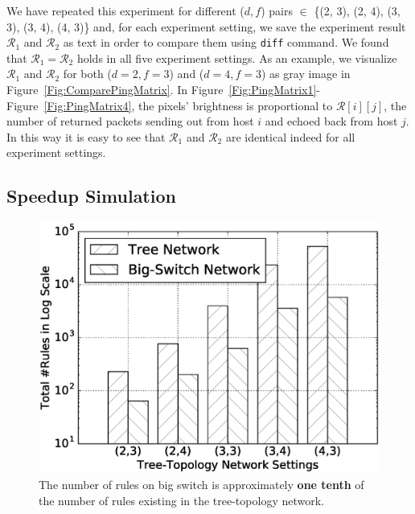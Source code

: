 We have repeated this experiment for different ($d, f$) pairs $\in$
\{(2, 3), (2, 4), (3, 3), (3, 4), (4, 3)\} and, for each experiment setting,
we save the experiment result $\mathcal{R}_1$ and $\mathcal{R}_2$
as text in order to compare them using \texttt{diff} command.
We found that $\mathcal{R}_1 = \mathcal{R}_2$ holds in all five experiment settings.
As an example, we visualize $\mathcal{R}_1$ and $\mathcal{R}_2$ for both ($d=2, f=3$)
and ($d=4, f=3$) as gray image in Figure~\ref{Fig:ComparePingMatrix}.
In Figure~\ref{Fig:PingMatrix1}-Figure~\ref{Fig:PingMatrix4},
the pixels' brightness is proportional to $\mathcal{R}[i][j]$,
the number of returned packets sending out from host $i$ and echoed back from host $j$.
In this way it is easy to see that $\mathcal{R}_1$ and $\mathcal{R}_2$ are identical
indeed for all experiment settings.

\subsection{Speedup Simulation}

\begin{figure}[h]
\centering
\includegraphics[scale=.42]{figures/comp_num_rules.eps}
\caption{The number of rules on big switch is approximately \textbf{one tenth} of the
        number of rules existing in the tree-topology network.}
\label{Fig:CompareNumRules}
\end{figure}

